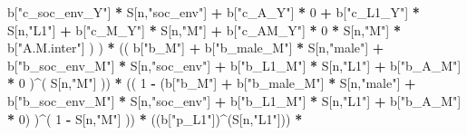 \documentclass[
]{book}
\newenvironment{Shaded}{\begin{snugshade}}{\end{snugshade}}
\newcommand{\DecValTok}[1]{\textcolor[rgb]{0.00,0.00,0.81}{#1}}
\newcommand{\NormalTok}[1]{#1}
\newcommand{\SpecialCharTok}[1]{\textcolor[rgb]{0.81,0.36,0.00}{\textbf{#1}}}
\newcommand{\StringTok}[1]{\textcolor[rgb]{0.31,0.60,0.02}{#1}}
\begin{document}
\begin{Shaded}
\begin{Highlighting}[]
\NormalTok{                              b[}\StringTok{"c\_soc\_env\_Y"}\NormalTok{] }\SpecialCharTok{*}\NormalTok{ S[n,}\StringTok{"soc\_env"}\NormalTok{] }\SpecialCharTok{+} 
\NormalTok{                              b[}\StringTok{"c\_A\_Y"}\NormalTok{] }\SpecialCharTok{*} \DecValTok{0} \SpecialCharTok{+} 
\NormalTok{                              b[}\StringTok{"c\_L1\_Y"}\NormalTok{] }\SpecialCharTok{*}\NormalTok{ S[n,}\StringTok{"L1"}\NormalTok{] }\SpecialCharTok{+}
\NormalTok{                              b[}\StringTok{"c\_M\_Y"}\NormalTok{] }\SpecialCharTok{*}\NormalTok{ S[n,}\StringTok{"M"}\NormalTok{] }\SpecialCharTok{+} 
\NormalTok{                              b[}\StringTok{"c\_AM\_Y"}\NormalTok{] }\SpecialCharTok{*} \DecValTok{0} \SpecialCharTok{*}\NormalTok{ S[n,}\StringTok{"M"}\NormalTok{] }\SpecialCharTok{*}\NormalTok{ b[}\StringTok{"A.M.inter"}\NormalTok{] ) ) }\SpecialCharTok{*}
\NormalTok{      (( b[}\StringTok{"b\_M"}\NormalTok{] }\SpecialCharTok{+} 
\NormalTok{           b[}\StringTok{"b\_male\_M"}\NormalTok{] }\SpecialCharTok{*}\NormalTok{ S[n,}\StringTok{"male"}\NormalTok{] }\SpecialCharTok{+} 
\NormalTok{           b[}\StringTok{"b\_soc\_env\_M"}\NormalTok{] }\SpecialCharTok{*}\NormalTok{ S[n,}\StringTok{"soc\_env"}\NormalTok{] }\SpecialCharTok{+} 
\NormalTok{           b[}\StringTok{"b\_L1\_M"}\NormalTok{] }\SpecialCharTok{*}\NormalTok{ S[n,}\StringTok{"L1"}\NormalTok{] }\SpecialCharTok{+}
\NormalTok{           b[}\StringTok{"b\_A\_M"}\NormalTok{] }\SpecialCharTok{*} \DecValTok{0}\NormalTok{ )}\SpecialCharTok{\^{}}\NormalTok{( S[n,}\StringTok{"M"}\NormalTok{] )) }\SpecialCharTok{*} 
\NormalTok{      (( }\DecValTok{1} \SpecialCharTok{{-}}\NormalTok{ (b[}\StringTok{"b\_M"}\NormalTok{] }\SpecialCharTok{+} 
\NormalTok{                b[}\StringTok{"b\_male\_M"}\NormalTok{] }\SpecialCharTok{*}\NormalTok{ S[n,}\StringTok{"male"}\NormalTok{] }\SpecialCharTok{+} 
\NormalTok{                b[}\StringTok{"b\_soc\_env\_M"}\NormalTok{] }\SpecialCharTok{*}\NormalTok{ S[n,}\StringTok{"soc\_env"}\NormalTok{] }\SpecialCharTok{+} 
\NormalTok{                b[}\StringTok{"b\_L1\_M"}\NormalTok{] }\SpecialCharTok{*}\NormalTok{ S[n,}\StringTok{"L1"}\NormalTok{] }\SpecialCharTok{+}
\NormalTok{                b[}\StringTok{"b\_A\_M"}\NormalTok{] }\SpecialCharTok{*} \DecValTok{0}\NormalTok{) )}\SpecialCharTok{\^{}}\NormalTok{( }\DecValTok{1} \SpecialCharTok{{-}}\NormalTok{ S[n,}\StringTok{"M"}\NormalTok{] ))  }\SpecialCharTok{*}
\NormalTok{      ((b[}\StringTok{"p\_L1"}\NormalTok{])}\SpecialCharTok{\^{}}\NormalTok{(S[n,}\StringTok{"L1"}\NormalTok{])) }\SpecialCharTok{*}

\end{Highlighting}
\end{Shaded}
\end{document}
